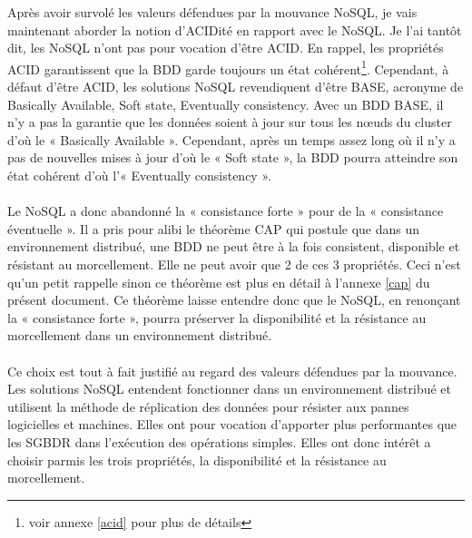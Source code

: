 Après avoir survolé les valeurs défendues par la
mouvance \textsf{NoSQL}, je vais maintenant aborder la notion
d'\textsf{ACIDité} en rapport avec le \textsf{NoSQL}. Je l'ai tantôt
dit, les \textsf{NoSQL} n'ont pas pour vocation
d'être \textsf{ACID}. En rappel, les propriétés \textsf{ACID}
garantissent que la \textsf{BDD} garde toujours un état
cohérent\footnote{voir annexe \ref{acid} pour plus de
détails}. Cependant, à défaut d'être \textsf{ACID}, les
solutions \textsf{NoSQL} revendiquent
d'être \textsf{BASE}\cite{RickCattell}, acronyme de \textsf{Basically
Available, Soft state, Eventually consistency}. Avec un \textsf{BDD
BASE}, il n'y a pas la garantie que les données soient à jour sur tous
les nœuds du cluster d'où le « \textsf{Basically Available}
». Cependant, après un temps assez long où il n'y a pas de nouvelles
mises à jour d'où le « \textsf{Soft state} », la \textsf{BDD} pourra
atteindre son état cohérent d'où l'« \textsf{Eventually consistency}
».
\\
\\
Le \textsf{NoSQL} a donc abandonné la « consistance forte » pour de la
« consistance éventuelle ». Il a pris pour alibi le
théorème \textsf{CAP}\cite{MichaelStonebraker2} qui postule que dans un environnement distribué,
une \textsf{BDD} ne peut être à la fois consistent, disponible et
résistant au morcellement. Elle ne peut avoir que 2 de ces 3
propriétés. Ceci n'est qu'un petit rappelle sinon ce théorème est plus
en détail à l'annexe \ref{cap} du présent
document. Ce théorème laisse entendre donc
que le \textsf{NoSQL}, en renonçant la « consistance forte », pourra
préserver la \textsf{disponibilité} et la \textsf{résistance au
morcellement} dans un environnement distribué.
\\
\\
Ce choix est tout à fait justifié au regard des valeurs défendues par
la mouvance. Les solutions \textsf{NoSQL} entendent fonctionner dans
un environnement distribué et utilisent la méthode de réplication des
données pour résister aux pannes logicielles et machines. Elles ont pour
vocation d'apporter plus performantes que les \textsf{SGBDR} dans
l'exécution des opérations simples. Elles ont donc intérêt a choisir
parmis les trois propriétés, la \textsf{disponibilité} et
la \textsf{résistance au morcellement}.
